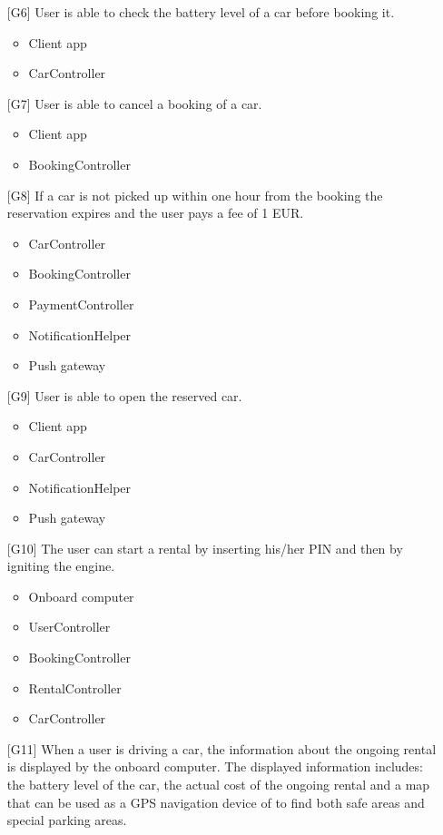 \begin{itemize}
\begin{itemize}
		\end{itemize}
	\item[{[G6]}] User is able to check the battery level of a car before booking it.
		\begin{itemize}
			\item Client app
			\item CarController
		\end{itemize}
	\item[{[G7]}] User is able to cancel a booking of a car.
		\begin{itemize}
			\item Client app
			\item BookingController
		\end{itemize}
	\item[{[G8]}] If a car is not picked up within one hour from the booking the reservation expires and the user pays a fee of 1 EUR.
		\begin{itemize}
			\item CarController
			\item BookingController
			\item PaymentController
			\item NotificationHelper
			\item Push gateway
		\end{itemize}
	\item[{[G9]}] User is able to open the reserved car.
		\begin{itemize}
			\item Client app
			\item CarController
			\item NotificationHelper
			\item Push gateway
		\end{itemize}
	\item[{[G10]}] The user can start a rental by inserting his/her PIN and then by igniting the engine.
		\begin{itemize}
			\item Onboard computer
			\item UserController
			\item BookingController
			\item RentalController
			\item CarController
		\end{itemize}
	\item[{[G11]}] When a user is driving a car, the information about the ongoing rental is displayed by the onboard computer. The displayed information includes: the battery level of the car, the actual cost of the ongoing rental and a map that can be used as a GPS navigation device of to find both safe areas and special parking areas.

\end{itemize}
